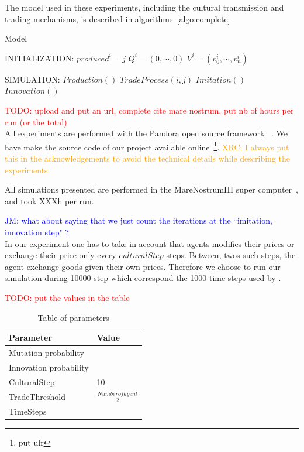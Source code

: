 \documentclass{wscpaperproc}
\newcommand{\memo}[2]{\textcolor{#1}{#2}}
\newcommand{\todo}[1]{\memo{red}{TODO: #1\\}}
\newcommand{\jm}[1]{\memo{blue}{JM: #1\\}}
\newcommand{\xrc}[1]{\memo{orange}{XRC: #1\\}}
\begin{document}
The model used in these experiments, including the cultural transmission and trading mechanisms, is described in algorithms~\ref{algo:complete}

\begin{algorithm}
\caption{Model}
\label{algo:complete}
	\begin{algorithmic}[1]
	\scriptsize
	\State INITIALIZATION: 
			 
				\State $produced^i = j$
				\State $Q^i = (0, \cdots, 0)$
				\State $V^i = (v^i_0, \cdots, v^i_n)$ 
			\EndFor
		\EndFor

	\State SIMULATION:
				\State $Production()$
					\State $TradeProcess(i,j)$
				\EndFor				
					\State $Imitation()$
					\State $Innovation()$
				\EndIf
			\EndFor
		\EndLoop
\end{algorithmic}
\end{algorithm}

\todo{upload and put an url, complete cite mare nostrum, put nb of hours per run (or the total)}
All experiments are performed with the Pandora open source framework ~\cite{rubiocampillo_2014}. We have make the source code of our project available online~\footnote{put ulr}. \xrc{I always put this in the acknowledgements to avoid the technical details while describing the experiments}

All simulations presented are performed in the MareNostrumIII super computer~\cite{}, and took XXXh per run.

\jm{what about saying that we just count the iterations at the ``imitation, innovation step" ?}
In our experiment one has to take in account that agents modifies their prices or exchange their price only every $culturalStep$ steps. Between, twos such steps, the agent exchange goods given their own prices. Therefore we choose to run our simulation during 10000 step which correspond the 1000 time steps used by \cite{bentley_random_2004,mesoudi_random_2009}.

\todo{put the values in the table}

\begin{table}
\begin{center}
\begin{tabular}{@{}ll@{}}
\toprule
Parameter & Value \\
\midrule
Mutation probability & \\
Innovation probability & \\
CulturalStep &  10 \\
TradeThreshold & $\frac{Number of agent}{2}$ \\
TimeSteps & \\
\bottomrule
\end{tabular}
\caption{Table of parameters}\label{tab:parameters}
\end{center}
\end{table}
\end{document}
